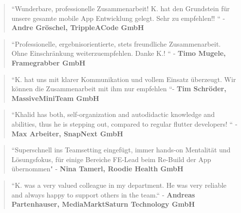 \documentclass[10pt,a4paper,normalphoto]{altacv}
\begin{document}
\begin{fullwidth}
\vspace{1em}


\vspace{2em}

\begin{quote}
``Wunderbare, professionelle Zusammenarbeit! K. hat den Grundstein für unsere gesamte mobile App Entwicklung gelegt. Sehr zu empfehlen!! `` - \textbf{Andre Gröschel, TrippleACode GmbH}\\
\end{quote}
\vspace{.5em}
\begin{quote}
``Professionelle, ergebnisorientierte, stets freundliche Zusammenarbeit. Ohne Einschränkung weiterzuempfehlen. Danke K.! `` - \textbf{Timo Mugele, Framegrabber GmbH}\\
\end{quote}

\vspace{.5em}

\begin{quote}
``K. hat uns mit klarer Kommunikation und vollem Einsatz überzeugt. Wir können die Zusammenarbeit mit ihm nur empfehlen ``- \textbf{Tim Schröder, MassiveMiniTeam GmbH}\\
\end{quote}

\vspace{.5em}
\begin{quote}
``Khalid has both, self-organization and autodidactic knowledge and abilities, thus he is stepping out, compared to regular flutter developers! `` - \textbf{Max Arbeiter, SnapNext GmbH}\\
\end{quote}

\vspace{.5em}    
\begin{quote}
``Superschnell ins Teamsetting eingefügt, immer hands-on Mentalität und Lösungsfokus, für einige Bereiche FE-Lead beim Re-Build der App übernommen" - \textbf{Nina Tamerl, Roodie Health GmbH}\\
\end{quote}

\vspace{.5em}
\begin{quote}
``K. was a very valued colleague in my department. He was very reliable and always happy to support others in the team.`` - \textbf{Andreas Partenhauser, MediaMarktSaturn Technology GmbH}\\
\end{quote}



\end{fullwidth}
\end{document}
